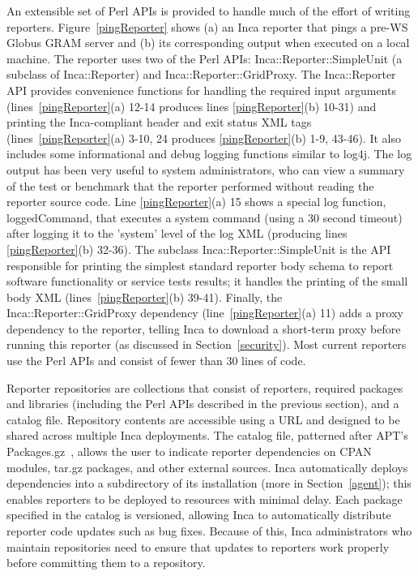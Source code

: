 \documentclass[times,10pt,twocolumn]{article}
\begin{document}
An extensible set of Perl APIs is provided to handle much of the effort of
writing reporters.  Figure~\ref{pingReporter} shows (a) an Inca reporter that
pings a pre-WS Globus GRAM server and (b) its corresponding output when
executed on a local machine.  The reporter uses two of the Perl APIs:
Inca::Reporter::SimpleUnit (a subclass of Inca::Reporter) and
Inca::Reporter::GridProxy.  The Inca::Reporter API provides convenience
functions for handling the required input arguments
(lines~\ref{pingReporter}(a) 12-14 produces lines \ref{pingReporter}(b)
10-31) and printing the Inca-compliant header and exit status XML tags
(lines~\ref{pingReporter}(a) 3-10, 24 produces \ref{pingReporter}(b)
1-9, 43-46).  It also includes some informational and debug logging functions
similar to log4j.  The log output has been very useful to system
administrators, who can view a summary of the test or benchmark that the
reporter performed without reading the reporter source code.  Line
\ref{pingReporter}(a) 15 shows a special log function, loggedCommand, that
executes a system command (using a 30 second timeout) after logging it to the
'system' level of the log XML (producing lines \ref{pingReporter}(b) 32-36).  The subclass
Inca::Reporter::SimpleUnit is the API responsible for printing the simplest
standard reporter body schema to report software functionality or service
tests results; it handles the printing of the small body XML
(lines~\ref{pingReporter}(b) 39-41).  Finally, the
Inca::Reporter::GridProxy dependency (line~\ref{pingReporter}(a) 11) adds a proxy
dependency to the reporter, telling Inca to download a
short-term proxy before running this reporter (as discussed in
Section~\ref{security}).  Most current reporters use the Perl APIs and consist
of fewer than 30 lines of code.


Reporter repositories are collections that consist of reporters, required
packages and libraries (including the Perl APIs described in the previous
section), and a catalog file.  Repository contents are accessible using a URL
and designed to be shared across multiple Inca deployments.  The catalog file,
patterned after APT's Packages.gz~\cite{apt}, allows the user to indicate
reporter dependencies on CPAN modules, tar.gz packages, and other external
sources.  Inca automatically deploys dependencies into a
subdirectory of its installation (more in Section~\ref{agent}); this enables
reporters to be deployed to resources with minimal delay.  Each package
specified in the catalog is versioned, allowing Inca to
automatically distribute reporter code updates such as bug fixes.  Because of
this, Inca administrators who maintain repositories need to ensure
that updates to reporters work properly before committing them to a repository.
\end{document}
